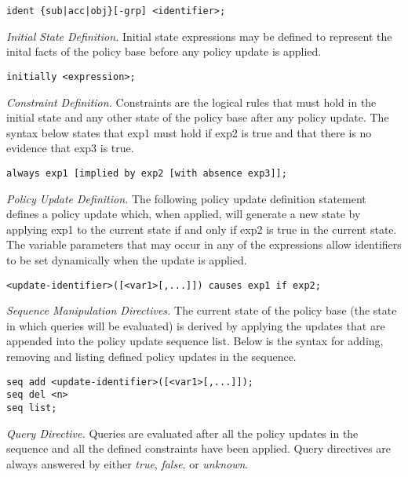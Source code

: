 \documentclass{llncs}
\begin{document}
    \begin{verbatim}ident {sub|acc|obj}[-grp] <identifier>;\end{verbatim}

    \noindent
    \emph{Initial State Definition.} Initial state expressions may be defined
    to represent the inital facts of the policy base before any policy update
    is applied.

    \begin{verbatim}initially <expression>;\end{verbatim}

    \noindent
    \emph{Constraint Definition.} Constraints are the logical rules that must
    hold in the initial state and any other state of the policy base after
    any policy update. The syntax below states that exp1 must hold if exp2 is 
    true and that there is no evidence that exp3 is true.

    \begin{verbatim}always exp1 [implied by exp2 [with absence exp3]];\end{verbatim}

    \noindent
    \emph{Policy Update Definition.} The following policy update definition
    statement defines a policy update which, when applied, will generate a new
    state by applying exp1 to the current state if and only if exp2 is true in
    the current state. The variable parameters that may occur in any of the
    expressions allow identifiers to be set dynamically when the update is
    applied.

    \begin{verbatim}<update-identifier>([<var1>[,...]]) causes exp1 if exp2;\end{verbatim}

    \noindent
    \emph{Sequence Manipulation Directives.} The current state of the policy
    base (the state in which queries will be evaluated) is derived by applying
    the updates that are appended into the policy update sequence list. Below
    is the syntax for adding, removing and listing defined policy updates in
    the sequence.

\begin{verbatim}
seq add <update-identifier>([<var1>[,...]]);
seq del <n>
seq list;
\end{verbatim}

    \noindent
    \emph{Query Directive.} Queries are evaluated after all the policy
    updates in the sequence and all the defined constraints have been
    applied. Query directives are always answered by either \emph{true},
    \emph{false}, or \emph{unknown}.
\end{document}
